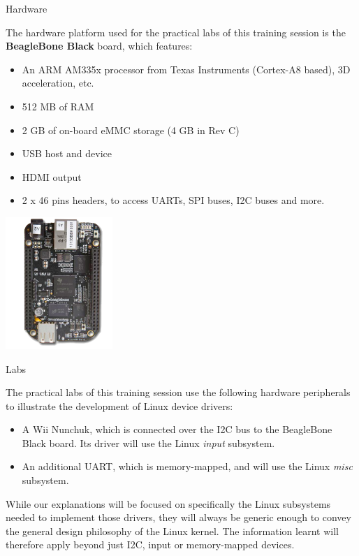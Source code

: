 \documentclass[a4paper,12pt,obeyspaces,spaces,hyphens]{article}
\begin{document}
\feagendatwocolumn
{Hardware}
{
  The hardware platform used for the practical labs of this training
  session is the {\bf BeagleBone Black} board, which features:

  \begin{itemize}
  \item An ARM AM335x processor from Texas Instruments (Cortex-A8
    based), 3D acceleration, etc.
  \item 512 MB of RAM
  \item 2 GB of on-board eMMC storage
        \newline(4 GB in Rev C)
  \item USB host and device
  \item HDMI output
  \item 2 x 46 pins headers, to access UARTs, SPI buses, I2C buses
    and more.
  \end{itemize}
}
{}
{
  \begin{center}
    \includegraphics[height=5cm]{agenda/beagleboneblack.png}
  \end{center}
}

\feagendaonecolumn
{Labs}
{
  The practical labs of this training session use the following
  hardware peripherals to illustrate the development of Linux device
  drivers:

  \begin{itemize}
  \item A Wii Nunchuk, which is connected over the I2C bus to the
    BeagleBone Black board. Its driver will use the Linux {\em input}
    subsystem.
  \item An additional UART, which is memory-mapped, and will use the
    Linux {\em misc} subsystem.
  \end{itemize}

  While our explanations will be focused on specifically the Linux
  subsystems needed to implement those drivers, they will always be
  generic enough to convey the general design philosophy of the Linux
  kernel. The information learnt will therefore apply beyond just
  I2C, input or memory-mapped devices.
}
\end{document}
